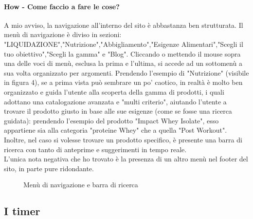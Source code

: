 \paragraph{How - Come faccio a fare le cose?}
A mio avviso, la navigazione all'interno del sito è abbastanza ben strutturata. Il menù di navigazione è diviso in sezioni: "LIQUIDAZIONE","Nutrizione","Abbigliamento","Esigenze Alimentari","Scegli il tuo obiettivo","Scegli la gamma" e "Blog".
Cliccando o mettendo il mouse sopra una delle voci di menù, esclusa la prima e l'ultima, si accede ad un sottomenù a sua volta organizzato per argomenti. Prendendo l'esempio di "Nutrizione"  (visibile in figura 4), se a prima vista può sembrare un po' caotico, in realtà è molto ben organizzato e guida l'utente alla scoperta della gamma di prodotti, i quali adottano una catalogazione avanzata e "multi criterio", aiutando l'utente a trovare il prodotto giusto in base alle sue esigenze (come se fosse una ricerca guidata): prendendo l'esempio del prodotto "Impact Whey Isolate", esso appartiene sia alla categoria "proteine Whey" che a quella "Post Workout". \\Inoltre, nel caso si volesse trovare un prodotto specifico, è presente una barra di ricerca con tanto di anteprime e suggerimenti in tempo reale.\\L'unica nota negativa che ho trovato è la presenza di un altro menù nel footer del sito, in parte pure ridondante.
\begin{figure}[!htb]
	\caption{\label{fig:figura4} Menù di navigazione e barra di ricerca}
\end{figure}
\subsection{I timer}

